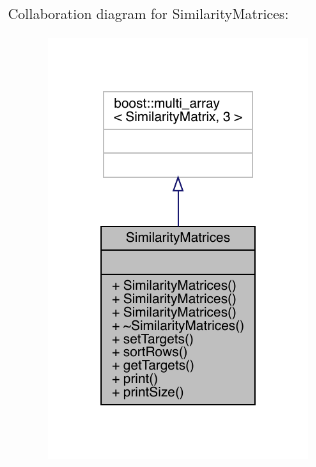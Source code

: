 Collaboration diagram for Similarity\+Matrices\+:
\nopagebreak
\begin{figure}[H]
\begin{center}
\leavevmode
\includegraphics[width=195pt]{class_similarity_matrices__coll__graph}
\end{center}
\end{figure}
